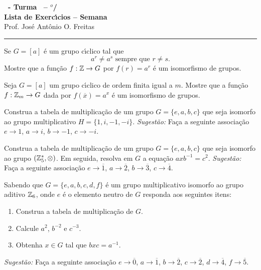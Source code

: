 \documentclass[12pt]{exam}
\begin{document}
\begin{center}

    {\Large\bf \disciplina\ - Turma \turma\ -- \semestre$^{o}$/\ano} \\ \vspace{9pt} {\large\bf
        Lista de Exerc{\'\i}cios -- Semana \numerosemana}\\ \vspace{9pt} Prof. Jos{\'e} Ant{\^o}nio O. Freitas
    \end{center}
    \hrule

    \vspace{.6cm}

    \questao{} Se $G = [a]$ \'e um grupo c{\'\i}clico tal que
    \[
        a^r \ne a^s \mbox{ sempre que } r \ne s.
    \]
    Mostre que a fun\c{c}\~ao $f : \mathbb{Z} \to G$ por $f(r) = a^r$ \'e um isomorfismo de grupos.

    \vspace{.3cm}

    \questao{} Seja $G = [a]$ um grupo c{\'\i}clico de ordem finita igual a $m$. Mostre que a fun\c{c}\~ao $f : \mathbb{Z}_m \to G$ dada por $f(\overline{x}) = a^x$ \'e um isomorfismo de grupos.

    \vspace{.3cm}

    \questao{} Construa a tabela de multiplica\c{c}\~ao de um grupo $G = \{e, a, b, c\}$ que seja isomorfo ao grupo multiplicativo $H = \{1, i, -1, -i\}$.
    \textit{Sugest\~ao:} Fa\c{c}a a seguinte associa\c{c}\~ao $e \to 1$, $a \to i$, $b \to -1$, $c \to -i$.

    \vspace{.3cm}

    \questao{} Construa a tabela de multiplica\c{c}\~ao de um grupo $G = \{e, a, b, c\}$ que seja isomorfo ao grupo $(\mathbb{Z}_5^*, \otimes)$. Em seguida, resolva em $G$ a equa\c{c}\~ao $axb^{-1} = c^2$.
    \textit{Sugest\~ao:} Fa\c{c}a a seguinte associa\c{c}\~ao $e \to \overline{1}$, $a \to \overline{2}$, $b \to \overline{3}$, $c \to \overline{4}$.

    \vspace{.3cm}

    \questao{} Sabendo que $G = \{e, a, b, c, d, f\}$ \'e um grupo multiplicativo isomorfo ao grupo aditivo $\mathbb{Z}_6$, onde $e$ \'e o elemento neutro de $G$ responda aos seguintes itens:
    \begin{enumerate}[label=({\alph*})]
      \item Construa a tabela de multiplica\c{c}\~ao de $G$.

      \item Calcule $a^2$, $b^{-2}$ e $c^{-3}$.

      \item Obtenha $x \in G$ tal que $bxc = a^{-1}$.
    \end{enumerate}
    \textit{Sugest\~ao:} Fa\c{c}a a seguinte associa\c{c}\~ao $e \to \overline{0}$, $a \to \overline{1}$, $b \to \overline{2}$, $c \to \overline{2}$, $d \to \overline{4}$, $f \to \overline{5}$.
\end{document}
